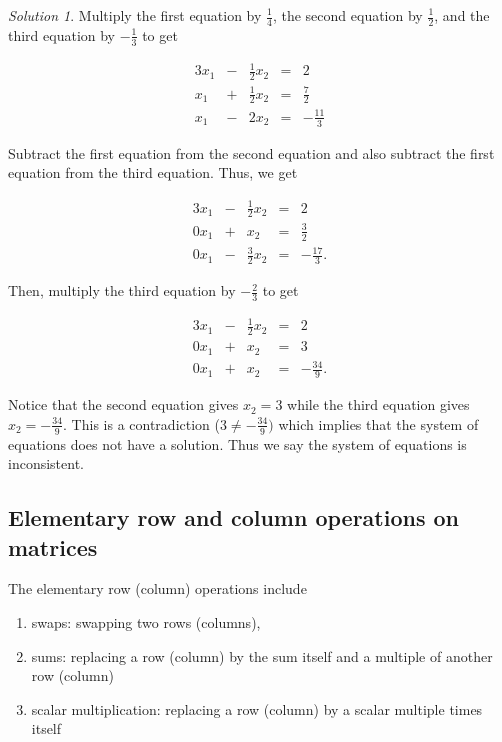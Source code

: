 \documentclass[
]{book}
\providecommand{\tightlist}{%
  \setlength{\itemsep}{0pt}\setlength{\parskip}{0pt}}
\theoremstyle{definition}
\theoremstyle{definition}
\theoremstyle{definition}
\theoremstyle{remark}
\newtheorem*{solution}{Solution}
\begin{document}
\begin{solution}

Multiply the first equation by \(\frac{1}{4}\), the second equation by \(\frac{1}{2}\), and the third equation by \(-\frac{1}{3}\) to get

\begin{alignat*}{3}
x_1 & {}-{} & \frac{1}{2} x_2 & {}={} & 2\\
x_1 & {}+{} & \frac{1}{2} x_2 & {}={} & \frac{7}{2} \\
 x_1 & {}-{} & 2 x_2 &{}={} & -\frac{11}{3}
\end{alignat*}

Subtract the first equation from the second equation and also subtract the first equation from the third equation. Thus, we get

\begin{alignat*}{3}
x_1 & {}-{} & \frac{1}{2} x_2 & {}={} & 2\\
0 x_1 & {}+{} & x_2 & {}={} & \frac{3}{2} \\
0 x_1 & {}-{} & \frac{3}{2} x_2 &{}={} & -\frac{17}{3}.
\end{alignat*}

Then, multiply the third equation by \(-\frac{2}{3}\) to get

\begin{alignat*}{3}
x_1 & {}-{} & \frac{1}{2} x_2 & {}={} & 2\\
0 x_1 & {}+{} & x_2 & {}={} & 3 \\
0 x_1 & {}+{} & x_2 &{}={} & - \frac{34}{9}.
\end{alignat*}

Notice that the second equation gives \(x_2 = 3\) while the third equation gives \(x_2 = -\frac{34}{9}\). This is a contradiction (\(3 \neq -\frac{34}{9})\) which implies that the system of equations does not have a solution. Thus we say the system of equations is inconsistent.

\end{solution}

\hypertarget{elementary-row-and-column-operations-on-matrices}{%
\subsection{Elementary row and column operations on matrices}\label{elementary-row-and-column-operations-on-matrices}}

The elementary row (column) operations include

\begin{enumerate}
\def\labelenumi{\arabic{enumi})}
\tightlist
\item
  swaps: swapping two rows (columns),
\item
  sums: replacing a row (column) by the sum itself and a multiple of another row (column)
\item
  scalar multiplication: replacing a row (column) by a scalar multiple times itself
\end{enumerate}
\end{document}
